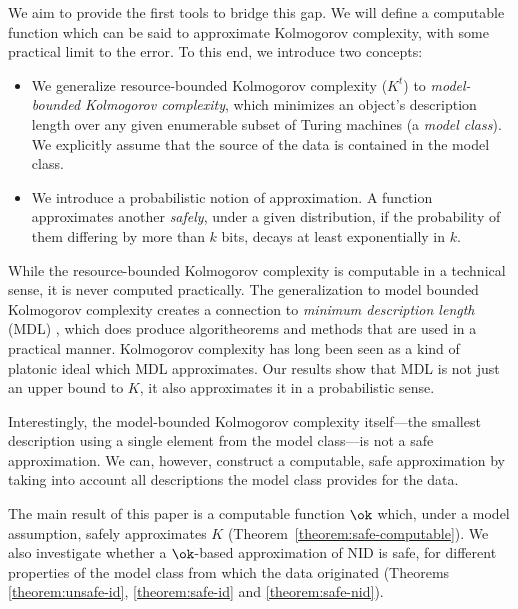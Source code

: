 We aim to provide the first tools to bridge this gap. We will define a computable function which can be said to approximate Kolmogorov complexity, with some practical limit to the error. To this end, we introduce two concepts:

\begin{itemize}
\item We generalize resource-bounded Kolmogorov complexity ($K^t$) to \emph{model-\\bounded Kolmogorov complexity}, which minimizes an object's description length over any given enumerable subset of Turing machines (a \emph{model class}). We explicitly assume that the source of the data is contained in the model class. 
\item We introduce a probabilistic notion of approximation. A function approximates another \emph{safely}, under a given distribution, if the probability of them differing by more than $k$ bits, decays at least exponentially in $k$. \footnotemark
\end{itemize}


\noindent While the resource-bounded Kolmogorov complexity is computable in a technical sense, it is never computed practically. The generalization to model bounded Kolmogorov complexity creates a connection to \emph{minimum description length} (MDL) \cite{rissanen1978modeling,DBLP:journals/tit/Rissanen84,grunwald2007minimum}, which does produce algoritheorems and methods that are used in a practical manner. Kolmogorov complexity has long been seen as a kind of platonic ideal which MDL approximates. Our results show that MDL is not just an upper bound to $K$, it also approximates it in a probabilistic sense.

Interestingly, the model-bounded Kolmogorov complexity itself---the smallest description using a single element from the model class---is not a safe approximation. We can, however, construct a computable, safe approximation by taking into account all descriptions the model class provides for the data.

The main result of this paper is a computable function $\ok$ which, under a model assumption, safely approximates $K$ (Theorem~\ref{theorem:safe-computable}). We also investigate whether a $\ok$-based approximation of NID is safe, for different properties of the model class from which the data originated (Theorems \ref{theorem:unsafe-id}, \ref{theorem:safe-id} and \ref{theorem:safe-nid}).


